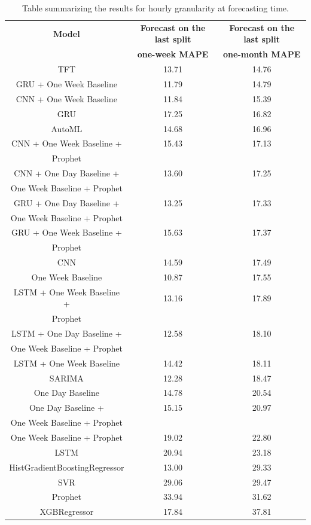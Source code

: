 \begin{table}[H]
\centering
\begin{tabular}{|c|c|c|}
\hline
\textbf{Model} & \textbf{Forecast on the last split} & \textbf{Forecast on the last split}\\
 & \textbf{one-week MAPE} & \textbf{one-month MAPE}\\
\hline
TFT & 13.71 & 14.76\\
\hline
GRU + One Week Baseline & 11.79 & 14.79\\
\hline
CNN + One Week Baseline & 11.84 & 15.39\\
\hline
GRU & 17.25 & 16.82\\
\hline
AutoML & 14.68 & 16.96\\
\hline
CNN + One Week Baseline + & 15.43 & 17.13\\
Prophet & & \\
\hline
CNN + One Day Baseline + & 13.60 & 17.25\\
One Week Baseline + Prophet & & \\
\hline
GRU + One Day Baseline + & 13.25 & 17.33\\
One Week Baseline + Prophet & & \\
\hline
GRU + One Week Baseline + & 15.63 & 17.37\\
Prophet & & \\
\hline
CNN & 14.59 & 17.49\\
\hline
One Week Baseline & 10.87 & 17.55\\
\hline
LSTM + One Week Baseline + & 13.16 & 17.89\\
Prophet & & \\
\hline
LSTM + One Day Baseline + & 12.58 & 18.10\\
One Week Baseline + Prophet & & \\
\hline
LSTM + One Week Baseline & 14.42 & 18.11\\
\hline
SARIMA & 12.28 & 18.47\\
\hline
One Day Baseline & 14.78 & 20.54\\
\hline
One Day Baseline + & 15.15 & 20.97\\
One Week Baseline + Prophet & & \\
\hline
One Week Baseline + Prophet & 19.02 & 22.80\\
\hline
LSTM & 20.94 & 23.18\\
\hline
HistGradientBoostingRegressor & 13.00 & 29.33\\
\hline
SVR & 29.06 & 29.47\\
\hline
Prophet & 33.94 & 31.62\\
\hline
XGBRegressor & 17.84 & 37.81\\
\hline
\end{tabular}
\caption{Table summarizing the results for hourly granularity at forecasting time.}
\label{tab:demandhourlyresultsforecast}
\end{table}

